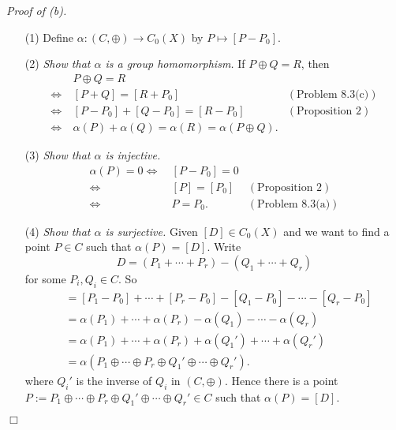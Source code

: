 \documentclass{article}
\begin{document}
\emph{Proof of (b).}
\begin{enumerate}
\item[(1)]
  Define $\alpha: (C,\oplus) \to C_0(X)$ by $P \mapsto [P-P_0]$.

\item[(2)]
  \emph{Show that $\alpha$ is a group homomorphism.}
  If $P \oplus Q = R$, then
  \begin{align*}
    & \:
    P \oplus Q = R \\
    \Longleftrightarrow& \:
    [P + Q] = [R + P_0]
      &(\text{Problem 8.3(c)}) \\
    \Longleftrightarrow& \:
    [P - P_0] + [Q - P_0] = [R - P_0]
      &(\text{Proposition 2}) \\
    \Longleftrightarrow& \:
    \alpha(P) + \alpha(Q) = \alpha(R) = \alpha(P \oplus Q).
  \end{align*}

\item[(3)]
  \emph{Show that $\alpha$ is injective.}
  \begin{align*}
    \alpha(P) = 0
    \Longleftrightarrow& \:
    [P - P_0] = 0 \\
    \Longleftrightarrow& \:
    [P] = [P_0]
      &(\text{Proposition 2}) \\
    \Longleftrightarrow& \:
    P = P_0.
      &(\text{Problem 8.3(a)})
  \end{align*}

\item[(4)]
  \emph{Show that $\alpha$ is surjective.}
  Given $[D] \in C_0(X)$ and we want to find a point $P \in C$ such that $\alpha(P) = [D]$.
  Write
  \[
    D = (P_1 + \cdots + P_r) - (Q_1 + \cdots + Q_r)
  \]
  for some $P_i, Q_i \in C$.
  So
  \begin{align*}
    [D]
    &= [P_1 - P_0] + \cdots + [P_r - P_0] - [Q_1 - P_0] - \cdots - [Q_r - P_0] \\
    &= \alpha(P_1) + \cdots + \alpha(P_r) - \alpha(Q_1) - \cdots - \alpha(Q_r) \\
    &= \alpha(P_1) + \cdots + \alpha(P_r) + \alpha(Q_1') + \cdots + \alpha(Q_r') \\
    &= \alpha(P_1 \oplus \cdots \oplus P_r \oplus Q_1' \oplus \cdots \oplus Q_r').
  \end{align*}
  where $Q_i'$ is the inverse of $Q_i$ in $(C,\oplus)$.
  Hence there is a point $P := P_1 \oplus \cdots \oplus P_r \oplus Q_1' \oplus \cdots \oplus Q_r' \in C$
  such that $\alpha(P) = [D]$.
\end{enumerate}
$\Box$ \\\\
\end{document}
